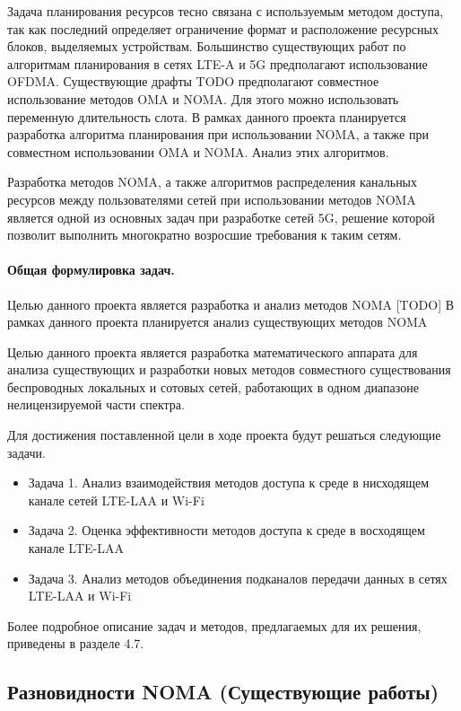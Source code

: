 \documentclass{book}
\numberwithin{theorem}{chapter}
\numberwithin{statement}{chapter}
\numberwithin{lemma}{chapter}
\theoremstyle{definition}
\numberwithin{task}{chapter}
\theoremstyle{remark}
\numberwithin{example}{chapter}
\theoremstyle{definition}
\numberwithin{definition}{chapter}
\theoremstyle{remark}
\theoremstyle{remark}
\numberwithin{lyrics}{section}
\begin{document}
Задача планирования ресурсов тесно связана с используемым методом доступа, так как последний определяет ограничение формат и расположение ресурсных блоков, выделяемых устройствам. Большинство существующих работ по алгоритмам планирования в сетях LTE-A и 5G предполагают использование OFDMA. Существующие драфты TODO предполагают совместное использование методов OMA и NOMA. Для этого можно использовать переменную длительность слота. В рамках данного проекта планируется разработка алгоритма планирования при использовании NOMA, а также при совместном использовании OMA и NOMA. Анализ этих алгоритмов.

Разработка методов NOMA, а также алгоритмов распределения канальных ресурсов между пользователями сетей при использовании методов NOMA является одной из основных задач при разработке сетей 5G, решение которой позволит выполнить многократно возросшие требования к таким сетям.

\paragraph{Общая формулировка задач.}
Целью данного проекта является разработка и анализ методов NOMA [TODO]
В рамках данного проекта планируется анализ существующих методов NOMA

Целью данного проекта является разработка математического аппарата для анализа существующих и разработки новых методов совместного существования беспроводных локальных и сотовых сетей, работающих в одном диапазоне нелицензируемой части спектра.

Для достижения поставленной цели в ходе проекта будут решаться следующие задачи.
\begin{itemize}
\item Задача 1. Анализ взаимодействия методов доступа к среде в нисходящем канале сетей LTE-LAA и Wi-Fi
\item Задача 2. Оценка эффективности методов доступа к среде в восходящем канале LTE-LAA
\item Задача 3. Анализ методов объединения подканалов передачи данных в сетях LTE-LAA и Wi-Fi
\end{itemize}
Более подробное описание задач и методов, предлагаемых для их решения, приведены в разделе 4.7. 

\subsection{Разновидности NOMA (Существующие работы)}
\end{document}
